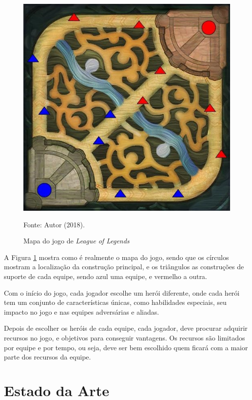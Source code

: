 \begin{figure}[!ht]
	\caption{Mapa do jogo de \textit{League of Legends}}
	\begin{center}
		\includegraphics{imagens/mapa_lol.jpg}
	\end{center}
	\small{Fonte: Autor (2018).}
	\label{fig:mapa_lol}
\end{figure}

	A Figura \ref{fig:mapa_lol} mostra como é realmente o mapa do jogo, sendo que os círculos mostram a localização da construção principal, e os triângulos as construções de suporte de cada equipe, sendo azul uma equipe, e vermelho a outra.
    
	Com o início do jogo, cada jogador escolhe  um  herói  diferente, onde  cada  herói tem um conjunto de características únicas, como habilidades especiais,  seu impacto  no jogo  e  nas equipes adversárias e aliadas.
    
	Depois de escolher os heróis de cada equipe, cada jogador, deve procurar adquirir recursos no jogo, e objetivos para conseguir vantagens. Os recursos são limitados por equipe e por tempo, ou seja, deve ser bem escolhido quem ficará com a maior parte dos recursos da equipe.

\section{Estado da Arte}

